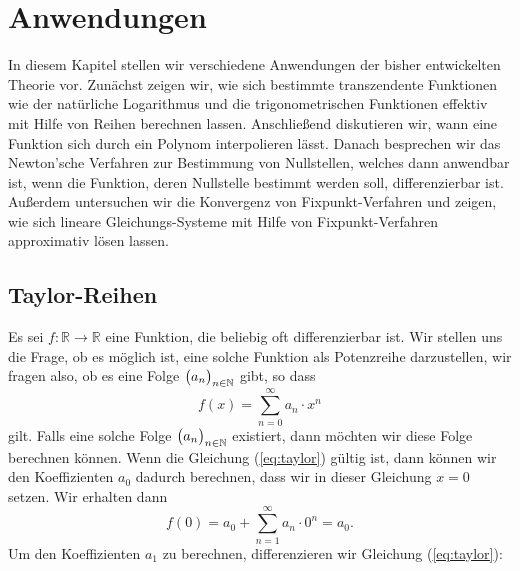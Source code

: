 \chapter{Anwendungen}
In diesem Kapitel stellen wir verschiedene Anwendungen der bisher entwickelten Theorie vor.
Zun\"achst zeigen wir, wie sich bestimmte transzendente Funktionen wie der nat\"urliche Logarithmus und die
trigonometrischen Funktionen effektiv mit Hilfe von Reihen berechnen lassen.   Anschlie{\ss}end diskutieren
wir, wann eine Funktion sich durch ein Polynom interpolieren l\"asst.
Danach besprechen wir das Newton'sche Verfahren zur Bestimmung von Nullstellen, welches dann anwendbar ist,
wenn die Funktion, deren Nullstelle bestimmt werden soll, differenzierbar ist.  Au{\ss}erdem untersuchen 
wir die Konvergenz von Fixpunkt-Verfahren und zeigen, wie sich lineare Gleichungs-Systeme mit Hilfe von
Fixpunkt-Verfahren approximativ l\"osen lassen.

\section{Taylor-Reihen}
Es sei $f:\mathbb{R} \rightarrow \mathbb{R}$ eine Funktion, die beliebig oft
differenzierbar ist. Wir stellen uns die Frage, ob es m\"oglich ist, eine solche Funktion
als Potenzreihe darzustellen, wir fragen also, ob es eine Folge $\bigl(a_n\bigr)_{n\in\mathbb{N}}$ gibt, so
dass 
\begin{equation}
  \label{eq:taylor}
 f(x) = \sum\limits_{n=0}^\infty a_n \cdot  x^n  
\end{equation}
gilt.  Falls eine solche Folge $\bigl(a_n\bigr)_{n\in\mathbb{N}}$ existiert, dann m\"ochten wir diese Folge
berechnen k\"onnen.  Wenn die Gleichung (\ref{eq:taylor}) g\"ultig ist, dann k\"onnen wir
den Koeffizienten $a_0$ dadurch berechnen, dass wir in dieser Gleichung $x=0$ setzen.
Wir erhalten dann
\begin{equation}
  \label{eq:taylor0}
 f(0) = a_0 + \sum\limits_{n=1}^\infty a_n \cdot  0^n  = a_0.
\end{equation}
Um den Koeffizienten $a_1$ zu berechnen, differenzieren wir Gleichung (\ref{eq:taylor}):

